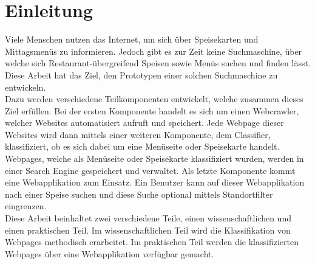 \chapter{Einleitung}
Viele Menschen nutzen das Internet, um sich über Speisekarten und Mittagsmenüs zu informieren.
Jedoch gibt es zur Zeit keine Suchmaschine, über welche sich Restaurant-übergreifend Speisen sowie Menüs suchen und finden lässt.
Diese Arbeit hat das Ziel, den Prototypen einer solchen Suchmaschine zu entwickeln.\\
Dazu werden verschiedene Teilkomponenten entwickelt, welche zusammen dieses Ziel erfüllen.
Bei der ersten Komponente handelt es sich um einen Webcrawler, welcher Websites automatisiert aufruft und speichert.
Jede Webpage dieser Websites wird dann mittels einer weiteren Komponente, dem Classifier, klassifiziert, ob es sich dabei um eine Menüseite oder Speisekarte handelt.
Webpages, welche als Menüseite oder Speisekarte klassifiziert wurden, werden in einer Search Engine gespeichert und verwaltet.
Als letzte Komponente kommt eine Webapplikation zum Einsatz. Ein Benutzer kann 
auf dieser Webapplikation nach einer Speise suchen und diese Suche optional 
mittels Standortfilter eingrenzen.\\
Diese Arbeit beinhaltet zwei verschiedene Teile, einen wissenschaftlichen und einen praktischen Teil.
Im wissenschaftlichen Teil wird die Klassifikation von Webpages methodisch erarbeitet.
Im praktischen Teil werden die klassifizierten Webpages über eine 
Webapplikation verfügbar gemacht.